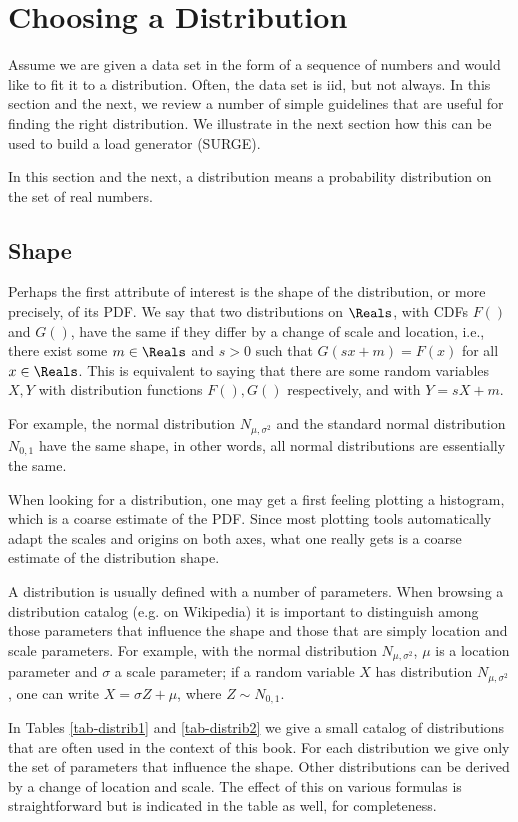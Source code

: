 \section{Choosing a Distribution}
Assume we are given a data set in the form of a
sequence of numbers and would like to fit it to a
distribution. Often, the data set is iid, but not
always. In this section and the next, we review a
number of simple guidelines that are useful for
finding the right distribution. We illustrate in
the next section how this can be used to build a
load generator (SURGE).

In this section and the next, a distribution
means a probability distribution on the set of
real numbers.

\subsection{Shape}
Perhaps the first attribute of interest is the
shape of the distribution, or more precisely, of
its PDF. We say that two distributions on
$\Reals$, with CDFs $F()$ and $G()$, have the
same  if they differ by a
change of scale and location, i.e., there exist
some $m \in \Reals$ and $s>0$ such that
$G(sx+m)=F(x)$ for all $x \in \Reals$. This is
equivalent to saying that there are some random
variables $X, Y$ with distribution functions
$F(), G()$ respectively, and with $Y=sX+m$.

For example, the normal distribution
$N_{\mu,\sigma^2}$ and the standard normal
distribution $N_{0,1}$ have the same shape, in
other words, all normal distributions are
essentially the same.

When looking for a distribution, one may get a
first feeling plotting a histogram, which is a
coarse estimate of the PDF. Since most plotting
tools automatically adapt the scales and origins
on both axes, what one really gets is a coarse
estimate of the distribution shape.

A distribution is usually defined with a number
of parameters. When browsing a distribution
catalog (e.g. on Wikipedia) it is important to
distinguish among those parameters that influence
the shape and those that are simply location and
scale parameters. For example, with the normal
distribution $N_{\mu,\sigma^2}$, $\mu$ is a
location parameter and $\sigma$ a scale
parameter; if a random variable $X$ has
distribution $N_{\mu,\sigma^2}$, one can write
$X=\sigma Z + \mu$, where $Z\sim N_{0,1}$.

In Tables \ref{tab-distrib1} and
\ref{tab-distrib2} we give a small catalog of
distributions that are often used in the context
of this book. For each distribution we give only
the set of parameters that influence the shape.
Other distributions can be derived by a change of
location and scale. The effect of this on various
formulas is straightforward but is indicated in
the table as well, for completeness.

